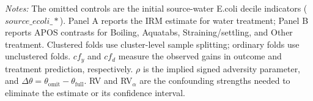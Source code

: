 \begin{landscape}
\begin{table}[p]
\par\vspace{3pt}
\begin{minipage}{\linewidth}\scriptsize \textit{Notes:} The omitted controls are the initial source-water E.coli decile indicators ($source\_ecoli\_*$). Panel A reports the IRM estimate for water treatment; Panel B reports APOS contrasts for Boiling, Aquatabs, Straining/settling, and Other treatment. Clustered folds use cluster-level sample splitting; ordinary folds use unclustered folds. $cf_y$ and $cf_d$ measure the observed gains in outcome and treatment prediction, respectively. $\rho$ is the implied signed adversity parameter, and $\Delta\theta = \theta_{\mathrm{omit}} - \theta_{\mathrm{full}}$. RV and RV$_\alpha$ are the confounding strengths needed to eliminate the estimate or its confidence interval.\end{minipage}
\end{table}
\end{landscape}